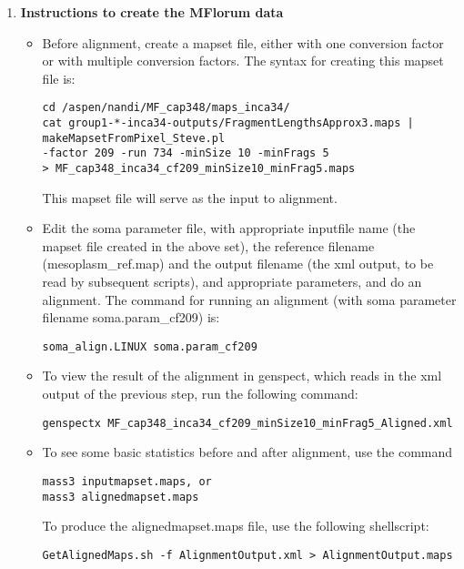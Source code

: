 \documentclass[11pt]{article}
\begin{document}
\begin{enumerate}
\item
{\bf{Instructions to create the MFlorum data}}\\
\begin{itemize}
\item
Before alignment, create a mapset file, either with one conversion factor or with multiple conversion factors. The syntax for creating this mapset file is:
\begin{verbatim}
cd /aspen/nandi/MF_cap348/maps_inca34/
cat group1-*-inca34-outputs/FragmentLengthsApprox3.maps | 
makeMapsetFromPixel_Steve.pl 
-factor 209 -run 734 -minSize 10 -minFrags 5 
> MF_cap348_inca34_cf209_minSize10_minFrag5.maps
\end{verbatim}
This mapset file will serve as the input to alignment.
\item
Edit the soma parameter file, with appropriate inputfile name (the mapset file created in the above set), the reference filename (mesoplasm\_ref.map) and the output filename (the xml output, to be read by subsequent scripts), and appropriate parameters, and do an alignment. The command for running an alignment (with soma parameter filename soma.param\_cf209) is:
\begin{verbatim}
soma_align.LINUX soma.param_cf209
\end{verbatim}
\item
To view the result of the alignment in genspect, which reads in the xml output of the previous step, run the following command:
\begin{verbatim}
genspectx MF_cap348_inca34_cf209_minSize10_minFrag5_Aligned.xml
\end{verbatim}
\item
To see some basic statistics before and after alignment, use the command 
\begin{verbatim}
mass3 inputmapset.maps, or
mass3 alignedmapset.maps
\end{verbatim}
To produce the alignedmapset.maps file, use the following shellscript:
\begin{verbatim}
GetAlignedMaps.sh -f AlignmentOutput.xml > AlignmentOutput.maps
\end{verbatim}


\end{itemize}
\end{enumerate}
\end{document}
